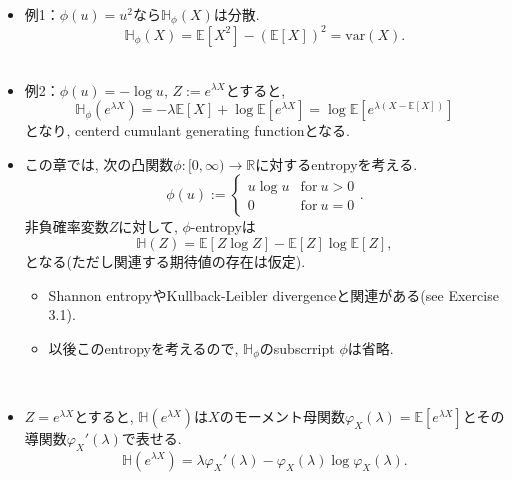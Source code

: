 \documentclass[aspectratio=169, dvipdfmx]{beamer}
\newcommand{\ex}{\mathbb{E}}
\newcommand{\var}{\mathrm{var}}
\begin{document}
\begin{frame}
\begin{itemize}
    \item 例1：$\phi(u) = u^2$なら$\mathbb{H}_\phi(X)$は分散.
        \[ \mathbb{H}_\phi(X) = \ex[X^2] - (\ex[X])^2 = \var(X).\]
    　
    \item 例2：$\phi(u) = -\log u$, $Z := e^{\lambda X}$とすると,
        \[ \mathbb{H}_\phi(e^{\lambda X})  = -\lambda \ex[X] + \log \ex[e^{\lambda X}] = \log\ex[e^{\lambda(X-\ex[X])}]\]
        となり, centerd cumulant generating functionとなる.
\end{itemize}
\end{frame}

\begin{frame}
    \begin{itemize}
        \item この章では, 次の凸関数$\phi:[0,\infty)\to\mathbb{R}$に対するentropyを考える.
        \[\phi(u) := 
            \begin{cases}
                u\log u & \mathrm{for} \ u > 0\\
                0       & \mathrm{for} \ u = 0
            \end{cases}.\tag{3.1}\label{3.1}
        \]
        非負確率変数$Z$に対して, $\phi$-entropyは
        \[ \mathbb{H}(Z) = \ex[Z\log Z] - \ex[Z]\log\ex[Z], \tag{3.2}\label{3.2}\]
        となる(ただし関連する期待値の存在は仮定). 
        \begin{itemize}
            \item Shannon entropyやKullback-Leibler divergenceと関連がある(see Exercise 3.1).
            \item 以後このentropyを考えるので, $\mathbb{H}_\phi$のsubscrript $\phi$は省略.
        \end{itemize}
        　
        \item $Z = e^{\lambda X}$とすると, $\mathbb{H}(e^{\lambda X})$は$X$のモーメント母関数$\varphi_X(\lambda)=\ex[e^{\lambda X}]$とその導関数$\varphi_X'(\lambda)$で表せる.
        \[\mathbb{H}(e^{\lambda X}) = \lambda \varphi_X'(\lambda) - \varphi_X(\lambda)\log\varphi_X(\lambda). \tag{3.3}\label{3.3}\]
    \end{itemize}
\end{frame}
\end{document}
